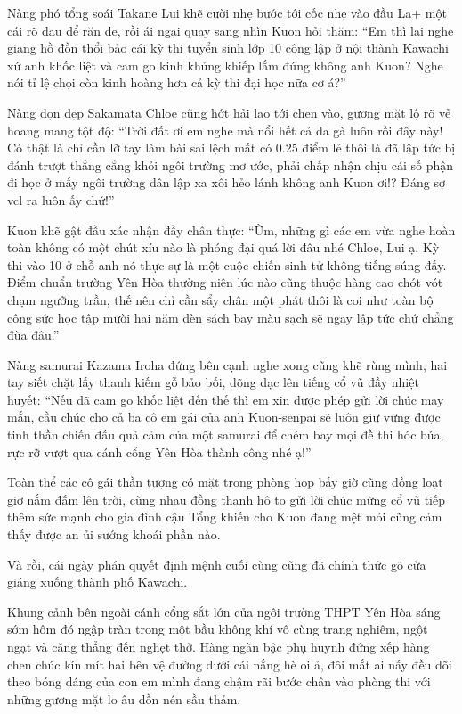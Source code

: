 \documentclass[../main.tex]{subfiles}
\begin{document}
Nàng phó tổng soái Takane Lui khẽ cười nhẹ bước tới cốc nhẹ vào đầu La+ một cái rõ đau để răn đe, rồi ái ngại quay sang nhìn Kuon hỏi thăm: ``Em thì lại nghe giang hồ đồn thổi bảo cái kỳ thi tuyển sinh lớp 10 công lập ở nội thành Kawachi xứ anh khốc liệt và cam go kinh khủng khiếp lắm đúng không anh Kuon? Nghe nói tỉ lệ chọi còn kinh hoàng hơn cả kỳ thi đại học nữa cơ á?''

Nàng dọn dẹp Sakamata Chloe cũng hớt hải lao tới chen vào, gương mặt lộ rõ vẻ hoang mang tột độ: ``Trời đất ơi em nghe mà nổi hết cả da gà luôn rồi đây này! Có thật là chỉ cần lỡ tay làm bài sai lệch mất có 0.25 điểm lẻ thôi là đã lập tức bị đánh trượt thẳng cẳng khỏi ngôi trường mơ ước, phải chấp nhận chịu cái số phận đi học ở mấy ngôi trường dân lập xa xôi hẻo lánh không anh Kuon ơi!? Đáng sợ vcl ra luôn ấy chứ!''

Kuon khẽ gật đầu xác nhận đầy chân thực: ``Ừm, những gì các em vừa nghe hoàn toàn không có một chút xíu nào là phóng đại quá lời đâu nhé Chloe, Lui ạ. Kỳ thi vào 10 ở chỗ anh nó thực sự là một cuộc chiến sinh tử không tiếng súng đấy. Điểm chuẩn trường Yên Hòa thường niên lúc nào cũng thuộc hàng cao chót vót chạm ngưỡng trần, thế nên chỉ cần sẩy chân một phát thôi là coi như toàn bộ công sức học tập mười hai năm đèn sách bay màu sạch sẽ ngay lập tức chứ chẳng đùa đâu.''

Nàng samurai Kazama Iroha đứng bên cạnh nghe xong cũng khẽ rùng mình, hai tay siết chặt lấy thanh kiếm gỗ bảo bối, dõng dạc lên tiếng cổ vũ đầy nhiệt huyết: ``Nếu đã cam go khốc liệt đến thế thì em xin được phép gửi lời chúc may mắn, cầu chúc cho cả ba cô em gái của anh Kuon-senpai sẽ luôn giữ vững được tinh thần chiến đấu quả cảm của một samurai để chém bay mọi đề thi hóc búa, rực rỡ vượt qua cánh cổng Yên Hòa thành công nhé ạ!''

Toàn thể các cô gái thần tượng có mặt trong phòng họp bấy giờ cũng đồng loạt giơ nắm đấm lên trời, cùng nhau đồng thanh hô to gửi lời chúc mừng cổ vũ tiếp thêm sức mạnh cho gia đình cậu Tổng khiến cho Kuon đang mệt mỏi cũng cảm thấy được an ủi sướng khoái phần nào.

\ct

Và rồi, cái ngày phán quyết định mệnh cuối cùng cũng đã chính thức gõ cửa giáng xuống thành phố Kawachi.

Khung cảnh bên ngoài cánh cổng sắt lớn của ngôi trường THPT Yên Hòa sáng sớm hôm đó ngập tràn trong một bầu không khí vô cùng trang nghiêm, ngột ngạt và căng thẳng đến nghẹt thở. Hàng ngàn bậc phụ huynh đứng xếp hàng chen chúc kín mít hai bên vệ đường dưới cái nắng hè oi ả, đôi mắt ai nấy đều dõi theo bóng dáng của con em mình đang chậm rãi bước chân vào phòng thi với những gương mặt lo âu dồn nén sầu thảm.
\end{document}
